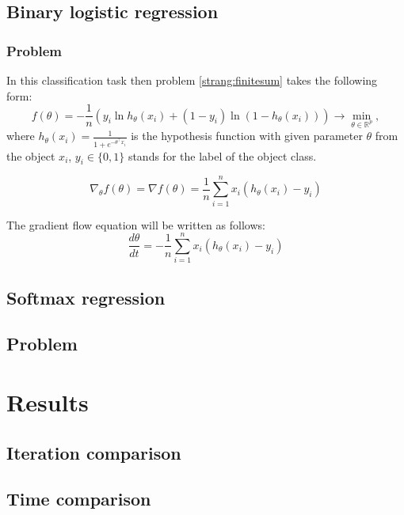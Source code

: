 \documentclass{article}
\begin{document}
\subsection{Binary logistic regression}
\subsubsection{Problem}
In this classification task then problem \eqref{strang:finitesum} takes the following form:
\begin{equation}\label{strang:LogReg}
   f(\theta) = -\frac{1}{n} \left(y_i \ln h_{\theta}(x_i)  + (1-y_i) \ln (1-h_{\theta}(x_i))\right) \to \min_{\theta \in \mathbb{R}^p},
\end{equation}
where $h_\theta(x_i) = \frac{1}{1 + e^{-\theta^\top x_i}}$ is the hypothesis function with given parameter $\theta$ from the object $x_i$, $ y_i \in \{0,1\}$ stands for the label of the object class.

\begin{equation}\label{strang:LogReg_grad}
\nabla_\theta f(\theta) = \nabla f(\theta) = \frac{1}{n}\sum\limits_{i=1}^n x_i(h_\theta(x_i) - y_i)
\end{equation}

The gradient flow equation will be written as follows:
\begin{equation}\label{strang:LogReg_GF}
\frac{d \theta}{d t} = - \frac{1}{n}\sum\limits_{i=1}^n x_i(h_\theta(x_i) - y_i)
\end{equation}


\subsection{Softmax regression}
\subsection{Problem}


\section{Results}
\subsection{Iteration comparison}
\subsection{Time comparison}
\end{document}
